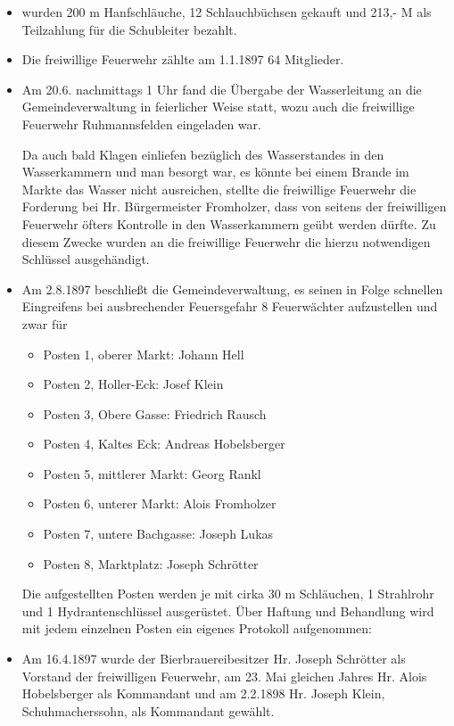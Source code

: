 \documentclass[12pt,a4paper]{book}
\begin{document}
\begin{itemize}
\item wurden 200 m Hanfschläuche, 12 Schlauchbüchsen gekauft und 213,- M
als Teilzahlung für die Schubleiter bezahlt.

\item Die freiwillige Feuerwehr zählte am 1.1.1897 64 Mitglieder.

\item Am 20.6. nachmittags 1 Uhr fand die Übergabe der Wasserleitung an
die Gemeindeverwaltung in feierlicher Weise statt, wozu auch die
freiwillige Feuerwehr Ruhmannsfelden eingeladen war.

Da auch bald Klagen einliefen bezüglich des Wasserstandes in den
Wasserkammern und man besorgt war, es könnte bei einem Brande im Markte
das Wasser nicht ausreichen, stellte die freiwillige Feuerwehr die
Forderung bei Hr. Bürgermeister Fromholzer, dass von seitens der
freiwilligen Feuerwehr öfters Kontrolle in den Wasserkammern geübt
werden dürfte. Zu diesem Zwecke wurden an die freiwillige Feuerwehr die
hierzu notwendigen Schlüssel ausgehändigt.

\item Am 2.8.1897 beschließt die Gemeindeverwaltung, es seinen in Folge
schnellen Eingreifens bei ausbrechender Feuersgefahr 8 Feuerwächter
aufzustellen und zwar für

\begin{itemize}
\item Posten 1, oberer Markt: Johann Hell
\item Posten 2, Holler-Eck: Josef Klein
\item Posten 3, Obere Gasse: Friedrich Rausch
\item Posten 4, Kaltes Eck: Andreas Hobelsberger
\item Posten 5, mittlerer Markt: Georg Rankl
\item Posten 6, unterer Markt: Alois Fromholzer
\item Posten 7, untere Bachgasse: Joseph Lukas
\item Posten 8, Marktplatz: Joseph Schrötter
\end{itemize}

Die aufgestellten Posten werden je mit cirka 30 m Schläuchen, 1
Strahlrohr und 1 Hydrantenschlüssel ausgerüstet. Über Haftung und
Behandlung wird mit jedem einzelnen Posten ein eigenes Protokoll
aufgenommen:

\item Am 16.4.1897 wurde der Bierbrauereibesitzer Hr. Joseph Schrötter
als Vorstand der freiwilligen Feuerwehr, am 23. Mai gleichen Jahres Hr.
Alois Hobelsberger als Kommandant und am 2.2.1898 Hr. Joseph Klein,
Schuhmacherssohn, als Kommandant gewählt.
\end{itemize}
\end{document}
